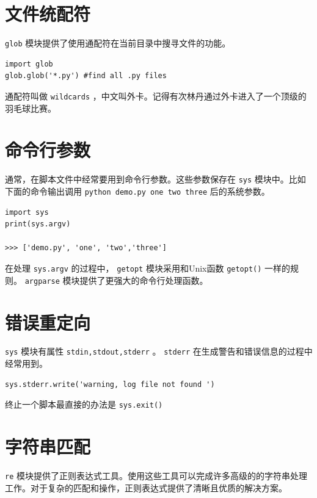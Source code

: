 \documentclass[10pt,a4paper,UTF8]{article}
\begin{document}
\section{文件统配符}
\label{sec:orga0532bc}


\texttt{glob} 模块提供了使用通配符在当前目录中搜寻文件的功能。

\begin{verbatim}
import glob
glob.glob('*.py') #find all .py files
\end{verbatim}

通配符叫做 \texttt{wildcards} ，中文叫外卡。记得有次林丹通过外卡进入了一个顶级的羽毛球比赛。
\section{命令行参数}
\label{sec:orgec75c03}


通常，在脚本文件中经常要用到命令行参数。这些参数保存在 \texttt{sys} 模块中。比如下面的命令输出调用 \texttt{python demo.py one two three} 后的系统参数。

\begin{verbatim}
import sys
print(sys.argv)

>>> ['demo.py', 'one', 'two','three']
\end{verbatim}

在处理 \texttt{sys.argv} 的过程中， \texttt{getopt} 模块采用和Unix函数 \texttt{getopt()} 一样的规则。 \texttt{argparse} 模块提供了更强大的命令行处理函数。

\section{错误重定向}
\label{sec:org3b1b4f5}


\texttt{sys} 模块有属性 \texttt{stdin,stdout,stderr} 。 \texttt{stderr} 在生成警告和错误信息的过程中经常用到。
\begin{verbatim}
sys.stderr.write('warning, log file not found ')
\end{verbatim}

终止一个脚本最直接的办法是 \texttt{sys.exit()}

\section{字符串匹配}
\label{sec:org9ea832c}


\texttt{re} 模块提供了正则表达式工具。使用这些工具可以完成许多高级的的字符串处理工作。对于复杂的匹配和操作，正则表达式提供了清晰且优质的解决方案。
\end{document}
